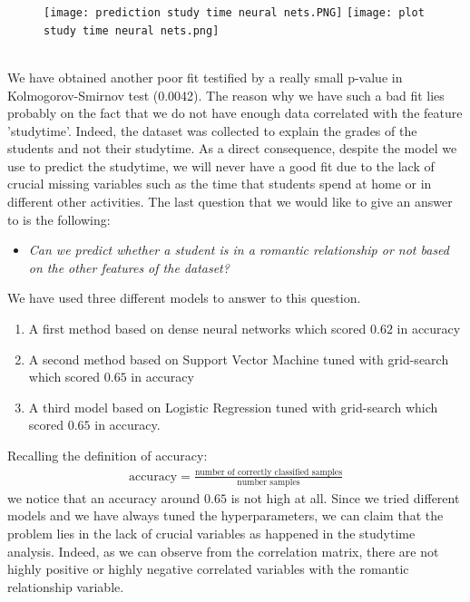 \documentclass[a4paper, 11pt]{report}
\theoremstyle{definition}
\numberwithin{equation}{section}		%
\numberwithin{table}{section}				%
\begin{document}
\begin{figure}[H]\centering
\texttt{[image: prediction study time neural nets.PNG]}
\texttt{[image: plot study time neural nets.png]}
\end{figure}
\\
We have obtained another poor fit testified by a really small p-value in Kolmogorov-Smirnov test (0.0042). The reason why we have such a bad fit lies probably on the fact that we do not have enough data correlated with the feature 'studytime'. Indeed, the dataset was collected to explain the grades of the students and not their studytime. As a direct consequence, despite the model we use to predict the studytime, we will never have a good fit due to the lack of crucial missing variables such as the time that students spend at home or in different other activities.
The last question that we would like to give an answer to is the following:
\begin{itemize}
    \item \textit{Can we predict whether a student is in a romantic relationship or not based on the other features of the dataset?}
\end{itemize}
We have used three different models to answer to this question.
\begin{enumerate}
    \item A first method based on dense neural networks which scored $0.62$ in accuracy
    \item A second method based on Support Vector Machine tuned with grid-search which scored $0.65$ in accuracy 
    \item A third model based on Logistic Regression tuned with grid-search which scored $0.65$ in accuracy.
\end{enumerate}
Recalling the definition of accuracy:
\begin{align*}
    \text{accuracy} = \frac{\text{number of correctly classified samples}}{\text{number samples}}
\end{align*}
we notice that an accuracy around $0.65$ is not high at all. Since we tried different models and we have always tuned the hyperparameters, we can claim that the problem lies in the lack of crucial variables as happened in the studytime analysis. Indeed, as we can observe from the correlation matrix, there are not highly positive or highly negative correlated variables with the romantic relationship variable.
\end{document}
